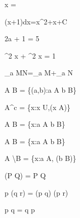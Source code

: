 x = 

\int (x+1)dx=x^2+x+C

2a + 1 = 5


\sin^2 x + \cos^2 x = 1

\log_a  MN=\log_a M+\log_a N

A \times B = \{(a,b):a \in A \wedge b \in B\}

A^c = \{x:x \in U,\neg (x \in A)\}

A \cup B = \{x:a \in A \vee b \in B\}

A \cap B = \{x:a \in A \wedge b \in B\}

A \backslash B = \{x:a \in A, \neg(b \in B)\}

\neg (P \vee Q) = \nge P \wedge \neg Q

p \vee (q \wedge r) = (p \vee q) \wedge (p \vee r)

p \vee q = q \vee p